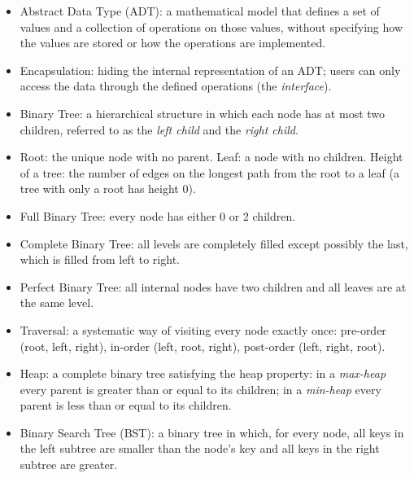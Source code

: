 \documentclass[11pt]{article}
\newcommand{\cle}[1]{{\popxbold\color{popdark}#1}}
\begin{document}
\begin{aretenir}
\begin{itemize}
\item \cle{Abstract Data Type (ADT)}: a mathematical model that defines a set of values and a collection of operations on those values, without specifying how the values are stored or how the operations are implemented.
\item \cle{Encapsulation}: hiding the internal representation of an ADT; users can only access the data through the defined operations (the \emph{interface}).
\item \cle{Binary Tree}: a hierarchical structure in which each node has at most two children, referred to as the \emph{left child} and the \emph{right child}.
\item \cle{Root}: the unique node with no parent. \cle{Leaf}: a node with no children. \cle{Height} of a tree: the number of edges on the longest path from the root to a leaf (a tree with only a root has height $0$).
\item \cle{Full Binary Tree}: every node has either 0 or 2 children.
\item \cle{Complete Binary Tree}: all levels are completely filled except possibly the last, which is filled from left to right.
\item \cle{Perfect Binary Tree}: all internal nodes have two children and all leaves are at the same level.
\item \cle{Traversal}: a systematic way of visiting every node exactly once: pre-order (root, left, right), in-order (left, root, right), post-order (left, right, root).
\item \cle{Heap}: a complete binary tree satisfying the heap property: in a \emph{max-heap} every parent is greater than or equal to its children; in a \emph{min-heap} every parent is less than or equal to its children.
\item \cle{Binary Search Tree (BST)}: a binary tree in which, for every node, all keys in the left subtree are smaller than the node's key and all keys in the right subtree are greater.
\end{itemize}
\end{aretenir}
\end{document}
